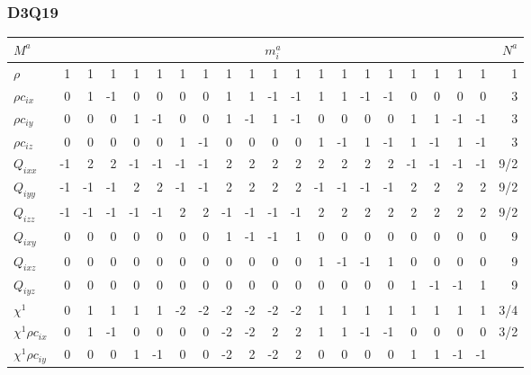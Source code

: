 \subsubsection{D3Q19}

\begin{table}
\begin{tabular}{|l||r|rrrrrr|rrrr|rrrr|rrrr|r||}
\hline\hline
$M^a$ & \multicolumn{19}{c||}{$m_i^a$} & $N^a$\\
\hline
$\rho $ & 1 &  1 &  1 &  1 &  1 &  1 &  1 & 
         1 &  1 &  1 &   1 &  1 &  1 &  1 & 1 & 1 & 1 & 1 & 1
& 1\\
\hline
$\rho c_{ix}$ & 0 &  1 &  -1 &  0 &  0 &  0 &  0 & 
         1 &  1 &  -1 &   -1 &  1 &  1 &  -1 & -1 & 0 & 0 & 0 & 0
& 3 \\
\hline
$\rho c_{iy}$ & 0 &  0 &  0 &  1 &  -1 &  0 &  0 & 
         1 &  -1 &  1 &   -1 &  0 &  0 &  0 & 0 & 1 & 1 & -1 & -1
& 3\\
\hline
$\rho c_{iz}$ & 0 &  0 &  0 &  0 &  0 &  1 &  -1 & 
         0 &  0 &  0 &   0 &  1 &  -1 &  1 & -1 & 1 & -1 & 1 & -1
& 3\\
\hline
$Q_{ixx}$ & -1 &  2 &  2 &  -1&  -1 &  -1 &  -1 & 
         2 &  2 &  2 &   2 &  2 &  2 &  2 & 2 & -1 & -1 & -1 & -1
& 9/2\\
\hline
$Q_{iyy}$ & -1 &  -1 &  -1 &  2&  2 &  -1 &  -1 & 
         2 &  2 &  2 &   2 &  -1 &  -1 &  -1 & -1 & 2 & 2 & 2 & 2
& 9/2\\
\hline
$Q_{izz}$ & -1 &  -1 &  -1 &  -1&  -1 &  2 &  2 & 
         -1 &  -1 &  -1 &   -1 &  2 &  2 & 2 & 2 & 2 & 2 & 2 & 2
& 9/2\\
\hline
$Q_{ixy}$ & 0 &  0 &  0 &  0&  0 &  0 &  0 & 
          1 &  -1 &  -1 &    1 &  0 &  0 & 0 & 0 & 0 & 0 & 0 & 0
& 9\\
\hline
$Q_{ixz}$ & 0 &  0 &  0 &  0&  0 &  0 &  0 & 
          0 &   0 &   0 &   0 &  1 & -1 & -1 & 1 & 0 & 0 & 0 & 0
& 9\\
\hline
$Q_{iyz}$ & 0 &  0 &  0 &  0&  0 &  0 &  0 & 
          0 &   0 &   0 &   0 &  0 & 0 & 0 & 0 & 1 & -1 & -1 & 1
& 9\\
\hline\hline
$\chi^1$ & 0 &  1 &  1 &  1 &  1 &  -2 &  -2 & 
         -2 &  -2 &  -2 &  -2 &  1 &  1 & 1 & 1 & 1 & 1 & 1 & 1
& 3/4\\
\hline
$\chi^1 \rho c_{ix}$ & 0 &  1 &  -1 &  0&  0 &  0 &  0 & 
         -2 &  -2 &  2 &  2 &  1 &  1 & -1 & -1 & 0 & 0 & 0 & 0
& 3/2\\
\hline
$\chi^1 \rho c_{iy}$ & 0 &  0 &  0 &  1&  -1 &  0 &  0 & 
         -2 &  2 &  -2 &  2 &  0 &  0 & 0 & 0 & 1 & 1 & -1 & -1

\end{tabular}
\end{table}

